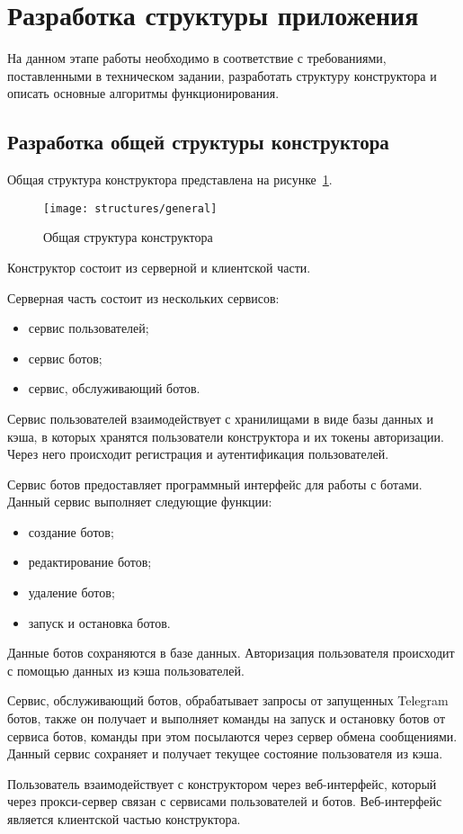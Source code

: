 
\newpage

\section{Разработка структуры приложения}

На данном этапе работы необходимо в соответствие с требованиями,
поставленными в техническом задании, разработать структуру конструктора
и описать основные алгоритмы функционирования.

\subsection{Разработка общей структуры конструктора }

Общая структура конструктора представлена на рисунке~\ref{f:general-struct}.

\begin{figure}[ht]
	\centering
	\texttt{[image: structures/general]}
	\caption{Общая структура конструктора}
	\label{f:general-struct}
\end{figure}


Конструктор состоит из серверной и клиентской части.

Серверная часть состоит из нескольких сервисов:
\begin{itemize}
	\item сервис пользователей;
	\item сервис ботов;
	\item сервис, обслуживающий ботов.
\end{itemize}

Сервис пользователей взаимодействует с хранилищами в виде базы
данных и кэша, в которых хранятся пользователи конструктора и их токены
авторизации. Через него происходит регистрация и аутентификация
пользователей.

Сервис ботов предоставляет программный интерфейс для работы с
ботами. Данный сервис выполняет следующие функции:
\begin{itemize}
	\item создание ботов;
	\item редактирование ботов;
	\item удаление ботов;
	\item запуск и остановка ботов.
\end{itemize}

Данные ботов сохраняются в базе данных. Авторизация пользователя
происходит с помощью данных из кэша пользователей.

Сервис, обслуживающий ботов, обрабатывает запросы от запущенных
Telegram ботов, также он получает и выполняет команды на запуск и
остановку ботов от сервиса ботов, команды при этом посылаются через сервер
обмена сообщениями. Данный сервис сохраняет и получает текущее состояние
пользователя из кэша.

Пользователь взаимодействует с конструктором через веб-интерфейс,
который через прокси-сервер связан с сервисами пользователей и ботов.
Веб-интерфейс является клиентской частью конструктора.





